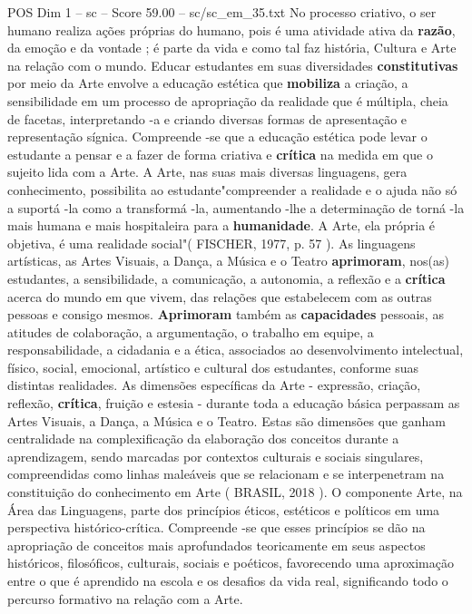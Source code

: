 \begin{textsample}{POS Dim 1 – sc – Score 59.00 – sc/sc\_em\_35.txt}
No processo criativo, o ser humano realiza ações próprias do humano, pois é uma atividade ativa da \textbf{razão}, da emoção e da vontade ; é parte da vida e como tal faz história, Cultura e Arte na relação com o mundo.
Educar estudantes em suas diversidades \textbf{constitutivas} por meio da Arte envolve a educação estética que \textbf{mobiliza} a criação, a sensibilidade em um processo de apropriação da realidade que é múltipla, cheia de facetas, interpretando -a e criando diversas formas de apresentação e representação sígnica.
Compreende -se que a educação estética pode levar o estudante a pensar e a fazer de forma criativa e \textbf{crítica} na medida em que o sujeito lida com a Arte.
A Arte, nas suas mais diversas linguagens, gera conhecimento, possibilita ao estudante"compreender a realidade e o ajuda não só a suportá -la como a transformá -la, aumentando -lhe a determinação de torná -la mais humana e mais hospitaleira para a \textbf{humanidade}.
A Arte, ela própria é objetiva, é uma realidade social"( FISCHER, 1977, p. 57 ).
As linguagens artísticas, as Artes Visuais, a Dança, a Música e o Teatro \textbf{aprimoram}, nos(as) estudantes, a sensibilidade, a comunicação, a autonomia, a reflexão e a \textbf{crítica} acerca do mundo em que vivem, das relações que estabelecem com as outras pessoas e consigo mesmos. \textbf{Aprimoram} também as \textbf{capacidades} pessoais, as atitudes de colaboração, a argumentação, o trabalho em equipe, a responsabilidade, a cidadania e a ética, associados ao desenvolvimento intelectual, físico, social, emocional, artístico e cultural dos estudantes, conforme suas distintas realidades.
As dimensões específicas da Arte - expressão, criação, reflexão, \textbf{crítica}, fruição e estesia - durante toda a educação básica perpassam as Artes Visuais, a Dança, a Música e o Teatro.
Estas são dimensões que ganham centralidade na complexificação da elaboração dos conceitos durante a aprendizagem, sendo marcadas por contextos culturais e sociais singulares, compreendidas como linhas maleáveis que se relacionam e se interpenetram na constituição do conhecimento em Arte ( BRASIL, 2018 ).
O componente Arte, na Área das Linguagens, parte dos princípios éticos, estéticos e políticos em uma perspectiva histórico-crítica.
Compreende -se que esses princípios se dão na apropriação de conceitos mais aprofundados teoricamente em seus aspectos históricos, filosóficos, culturais, sociais e poéticos, favorecendo uma aproximação entre o que é aprendido na escola e os desafios da vida real, significando todo o percurso formativo na relação com a Arte.

\end{textsample}

